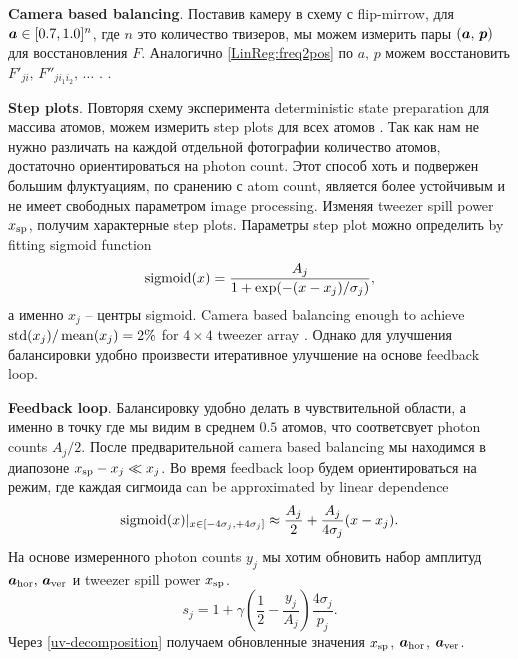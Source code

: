 

\textbf{Camera based balancing}. Поставив камеру в схему  с flip-mirrow, для $\boldsymbol{a} \in [0.7, 1.0]^n$, где $n$ это количество твизеров, мы можем измерить пары $(\boldsymbol{a},\, \boldsymbol{p})$ для восстановления $F$. Аналогично \eqref{LinReg:freq2pos} по $a,\, p$ можем восстановить $F'_{ji},\, F''_{j i_{1} i_{2}}, \, \ldots$ . .


\textbf{Step plots}. Повторяя схему эксперимента deterministic state preparation для массива атомов, можем измерить step plots для всех атомов . Так как нам не нужно различать на каждой отдельной фотографии количество атомов, достаточно ориентироваться на photon count. Этот способ хоть и подвержен большим флуктуациям, по сранению с atom count, является более устойчивым и не имеет свободных параметром image processing. Изменяя tweezer spill power $x_{\textnormal{sp}}$, получим характерные step plots.  Параметры step plot можно определить by fitting sigmoid function
\begin{equation*}
	\mathop{\mathrm{sigmoid}}\nolimits(x) = \frac{A_j}{1 + \exp(-(x-x_j) / \sigma_j)},
\end{equation*}
а именно $x_j$ -- центры sigmoid. Camera based balancing enough to achieve $\mathop{\mathrm{std}}\nolimits(x_j) / \mathop{\mathrm{mean}}\nolimits (x_j) = 2\%$ for $4\times4$ tweezer array . Однако для улучшения балансировки удобно произвести итеративное улучшение  на основе feedback loop. 

\textbf{Feedback loop}. Балансировку удобно делать в чувствительной области, а именно в точку где мы видим в среднем $0.5$ атомов, что соответсвует photon counts $A_j/2$.  После предварительной camera based balancing мы находимся в диапозоне $x_{\textnormal{sp}} - x_j \ll x_j$. Во время feedback loop будем ориентироваться на режим, где каждая сигмоида can be approximated by linear dependence
\begin{equation*}
	\mathop{\mathrm{sigmoid}}\nolimits(x)|_{x \in [-4 \sigma_j, + 4 \sigma_j]} \approx \frac{A_j}{2} + \frac{A_j}{4 \sigma_j} (x - x_j).
\end{equation*}
На основе измеренного photon counts $y_j$ мы хотим обновить набор амплитуд $\boldsymbol{a}_{\textnormal{hor}},\, \boldsymbol{a}_{\textnormal{ver}}$ и tweezer spill power $x_{\textnormal{sp}}$. 
\begin{equation*}
	s_j = 1 + \gamma \left(\frac{1}{2} - \frac{y_j}{A_j}\right) \frac{4 \sigma_j}{p_j}.
\end{equation*}
Через \eqref{uv-decomposition} получаем обновленные значения $x_{\textnormal{sp}}$, $\boldsymbol{a}_{\textnormal{hor}}$, $\boldsymbol{a}_{\textnormal{ver}}$.
